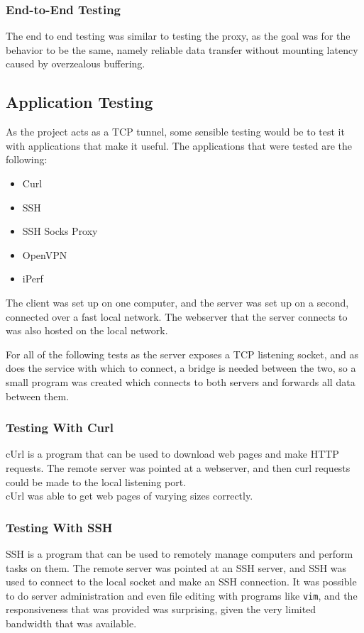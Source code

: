 \subsubsection*{End-to-End Testing}
The end to end testing was similar to testing the proxy, as the goal was for the behavior to be the same, namely reliable data transfer without mounting latency caused by overzealous buffering.

\subsection{Application Testing}
As the project acts as a TCP tunnel, some sensible testing would be to test it with applications that make it useful.
The applications that were tested are the following:
\begin{itemize}
    \item Curl
    \item SSH
    \item SSH Socks Proxy
    \item OpenVPN
    \item iPerf
\end{itemize}

The client was set up on one computer, and the server was set up on a second, connected over a fast local network.
The webserver that the server connects to was also hosted on the local network.\par

For all of the following tests as the server exposes a TCP listening socket, and as does the service with which to connect, a bridge is needed between the two, so a small program was created which connects to both servers and forwards all data between them.

\subsubsection*{Testing With Curl}
cUrl is a program that can be used to download web pages and make HTTP requests.
The remote server was pointed at a webserver, and then curl requests could be made to the local listening port.\\
cUrl was able to get web pages of varying sizes correctly.

\subsubsection*{Testing With SSH}
SSH is a program that can be used to remotely manage computers and perform tasks on them.
The remote server was pointed at an SSH server, and SSH was used to connect to the local socket and make an SSH connection.
It was possible to do server administration and even file editing with programs like \texttt{vim}, and the responsiveness that was provided was surprising, given the very limited bandwidth that was available.

